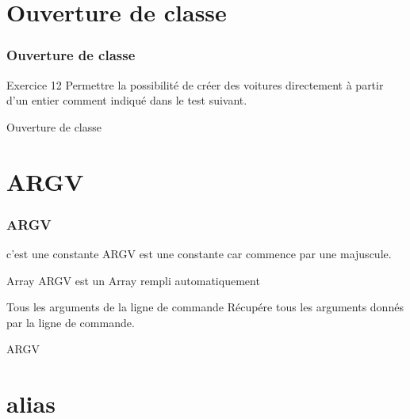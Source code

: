 \documentclass{beamer}
\begin{document}
\section{Ouverture de classe}

\begin{frame}
  \frametitle{Ouverture de classe}
  \begin{block}{Exercice 12}
    Permettre la possibilit\'e de cr\'eer des voitures directement à partir d'un entier comment indiqu\'e dans le test suivant.
  \end{block}
\end{frame}

\begin{frame}
  \begin{beamerboxesrounded}{Ouverture de classe}
    
  \end{beamerboxesrounded}
\end{frame}


\section{ARGV}

\begin{frame}
  \frametitle{ARGV}
  \begin{block}{c'est une constante}
    ARGV est une constante car commence par une majuscule.
  \end{block}
  \begin{block}{Array}
    ARGV est un Array rempli automatiquement
  \end{block}
  \begin{block}{Tous les arguments de la ligne de commande}
    R\'ecup\'ere tous les arguments donn\'es par la ligne de commande.
  \end{block}
\end{frame}

\begin{frame}
  \begin{beamerboxesrounded}{ARGV}
    
  \end{beamerboxesrounded}
\end{frame}


\section{alias}
\end{document}
